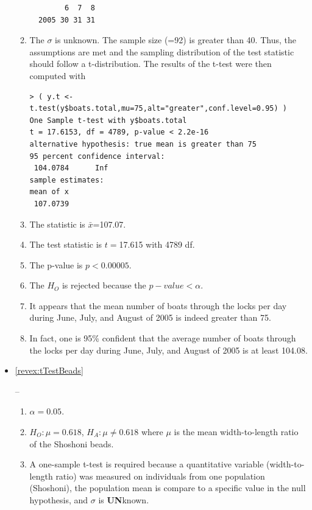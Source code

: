 \documentclass[10pt,openany]{book}\usepackage[]{graphicx}\usepackage[]{color}
\makeatletter
\newenvironment{kframe}{%
 \def\at@end@of@kframe{}%
 \ifinner\ifhmode%
  \def\at@end@of@kframe{\end{minipage}}%
  \begin{minipage}{\columnwidth}%
 \fi\fi%
 \def\FrameCommand##1{\hskip\@totalleftmargin \hskip-\fboxsep
 \colorbox{shadecolor}{##1}\hskip-\fboxsep
     \hskip-\linewidth \hskip-\@totalleftmargin \hskip\columnwidth}%
 \MakeFramed {\advance\hsize-\width
   \@totalleftmargin\z@ \linewidth\hsize
   \@setminipage}}%
 {\par\unskip\endMakeFramed%
 \at@end@of@kframe}
\newenvironment{knitrout}{}{} %
\makeatother
\begin{document}
\begin{itemize}
\begin{enumerate}
\begin{knitrout}
\begin{kframe}
\begin{verbatim}
        6  7  8
  2005 30 31 31
\end{verbatim}
\end{kframe}
\end{knitrout}
      \item The $\sigma$ is unknown.  The sample size (=92) is greater than 40.  Thus, the assumptions are met and the sampling distribution of the test statistic should follow a t-distribution.  The results of the t-test were then computed with
\begin{knitrout}
\color{fgcolor}\begin{kframe}
\begin{verbatim}
> ( y.t <- t.test(y$boats.total,mu=75,alt="greater",conf.level=0.95) )
One Sample t-test with y$boats.total 
t = 17.6153, df = 4789, p-value < 2.2e-16
alternative hypothesis: true mean is greater than 75 
95 percent confidence interval:
 104.0784      Inf 
sample estimates:
mean of x 
 107.0739 
\end{verbatim}
\end{kframe}
\end{knitrout}
      \item The statistic is $\bar{x}$=107.07.
      \item The test statistic is $t=$17.615 with 4789 df.
      \item The p-value is $p<0.00005$.
      \item The $H_{O}$ is rejected because the $p-value<\alpha$.
      \item It appears that the mean number of boats through the locks per day during June, July, and August of 2005 is indeed greater than 75.
      \item In fact, one is 95\% confident that the average number of boats through the locks per day during June, July, and August of 2005 is at least 104.08.
    \end{enumerate}
  \item \hypertarget{ans:tTestBeads}{\ref{revex:tTestBeads}} --
    \begin{enumerate}
      \item $\alpha=0.05$.
      \item $H_{O}:\mu=0.618$, $H_{A}:\mu\neq0.618$ where $\mu$ is the mean width-to-length ratio of the Shoshoni beads.
      \item A one-sample t-test is required because a quantitative variable (width-to-length ratio) was measured on individuals from one population (Shoshoni), the population mean is compare to a specific value in the null hypothesis, and $\sigma$ is \textbf{UN}known.

\end{enumerate}
\end{itemize}
\end{document}
